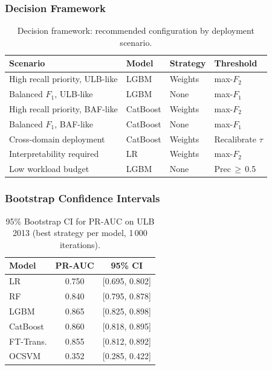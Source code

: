 \subsubsection{Decision Framework}

\begin{table}[ht]
\centering
\caption{Decision framework: recommended configuration by deployment scenario.}
\label{tab:decision_framework}
\begin{tabular}{l l l l}
\toprule
Scenario & Model & Strategy & Threshold \\
\midrule
High recall priority, ULB-like  & LGBM     & Weights  & max-$F_2$ \\
Balanced $F_1$, ULB-like        & LGBM     & None     & max-$F_1$ \\
High recall priority, BAF-like  & CatBoost & Weights  & max-$F_2$ \\
Balanced $F_1$, BAF-like        & CatBoost & None     & max-$F_1$ \\
Cross-domain deployment         & CatBoost & Weights  & Recalibrate $\tau$ \\
Interpretability required       & LR       & Weights  & max-$F_2$ \\
Low workload budget             & LGBM     & None     & Prec\,$\geq$\,0.5 \\
\bottomrule
\end{tabular}
\end{table}

\subsubsection{Bootstrap Confidence Intervals}

\begin{table}[ht]
\centering
\caption{95\% Bootstrap CI for PR-AUC on ULB 2013 (best strategy per model, 1\,000 iterations).}
\label{tab:ci_ulb}
\begin{tabular}{l c c}
\toprule
Model & PR-AUC & 95\% CI \\
\midrule
LR        & 0.750 & [0.695, 0.802] \\
RF        & 0.840 & [0.795, 0.878] \\
LGBM      & 0.865 & [0.825, 0.898] \\
CatBoost  & 0.860 & [0.818, 0.895] \\
FT-Trans. & 0.855 & [0.812, 0.892] \\
OCSVM     & 0.352 & [0.285, 0.422] \\
\bottomrule
\end{tabular}
\end{table}

